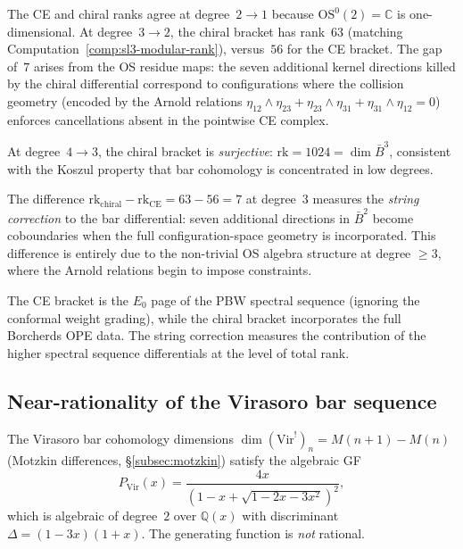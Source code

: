 The CE and chiral ranks agree at degree~$2 \to 1$ because
$\mathrm{OS}^0(2) = \mathbb{C}$ is one-dimensional.  At degree~$3 \to 2$,
the chiral bracket has rank~$63$ (matching
Computation~\ref{comp:sl3-modular-rank}), versus~$56$ for the
CE bracket.  The gap of~$7$ arises from the OS residue maps: the
seven additional kernel directions killed by the chiral
differential correspond to configurations where the collision
geometry (encoded by the Arnold relations
$\eta_{12} \wedge \eta_{23} + \eta_{23} \wedge \eta_{31} +
\eta_{31} \wedge \eta_{12} = 0$) enforces cancellations absent
in the pointwise CE complex.

At degree~$4 \to 3$, the chiral bracket is \emph{surjective}:
$\mathrm{rk} = 1024 = \dim \bar{B}^3$, consistent with the
Koszul property that bar cohomology is concentrated in low degrees.

\begin{remark}
\label{rem:ce-vs-chiral}
The difference $\mathrm{rk}_{\mathrm{chiral}} - \mathrm{rk}_{\mathrm{CE}}
= 63 - 56 = 7$ at degree~$3$ measures the \emph{string correction}
to the bar differential: seven additional directions in
$\bar{B}^2$ become coboundaries when the full configuration-space
geometry is incorporated.  This difference is entirely due to the
non-trivial OS algebra structure at degree $\geq 3$, where the
Arnold relations begin to impose constraints.

The CE bracket is the $E_0$ page of the PBW spectral
sequence (ignoring the conformal weight grading), while the
chiral bracket incorporates the full Borcherds OPE data.  The
string correction measures the contribution of the higher spectral
sequence differentials at the level of total rank.
\end{remark}

\subsection{Near-rationality of the Virasoro bar sequence}
\label{subsec:virasoro-near-rationality}

The Virasoro bar cohomology dimensions $\dim(\mathrm{Vir}^!)_n = M(n+1) - M(n)$
(Motzkin differences, \S\ref{subsec:motzkin}) satisfy the algebraic GF
\begin{equation}\label{eq:virasoro-gf-algebraic}
P_{\mathrm{Vir}}(x) = \frac{4x}{(1 - x + \sqrt{1-2x-3x^2})^2},
\end{equation}
which is algebraic of degree~$2$ over $\mathbb{Q}(x)$ with discriminant
$\Delta = (1-3x)(1+x)$.  The generating function is \emph{not} rational.

